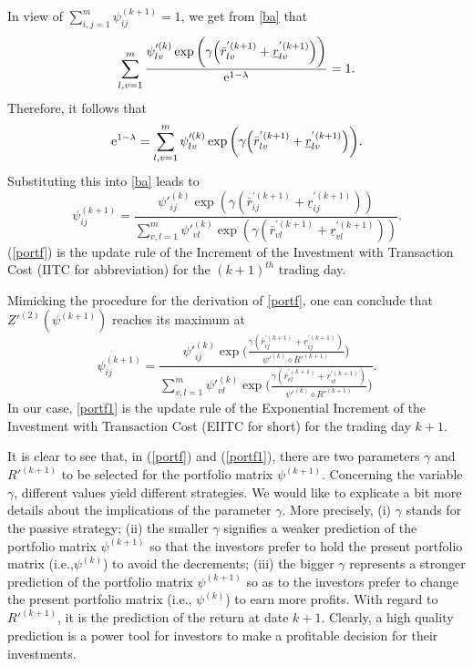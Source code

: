 \documentclass[11pt]{article}
\numberwithin{equation}{section}
\begin{document}
In view of  $\sum_{i,j=1}^m\psi^{(k+1)}_{ij}=1$, we get from \eqref{ba} that 
\begin{equation*} 
\sum_{l,v=1}^m\frac{\psi'^{(k)}_{lv}\exp\bigg(\gamma\Big(\bar r_{lv}^{'(k+1)}+\underline r_{lv}^{'(k+1)}\Big)\bigg)}{\text{\rm{e}}^{1-\lambda}}=1.
\end{equation*}
Therefore, it follows that
\begin{equation*} 
\text{\rm{e}}^{1-\lambda}=\sum_{l,v=1}^m\psi'^{(k)}_{lv}\exp\bigg(\gamma\Big(\bar r_{lv}^{'(k+1)}+\underline r_{lv}^{'(k+1)}\Big)\bigg).
\end{equation*}
Substituting this into \eqref{ba} leads to 
\begin{equation}\label{portf}
\psi^{(k+1)}_{ij}=\frac{\psi'^{(k)}_{ij}\exp(\gamma (\bar r_{ij}^{'(k+1)}+\underline r_{ij}^{'(k+1)}))}{\sum_{v,l=1}^{m}\psi'^{(k)}_{vl}\exp(\gamma (\bar r_{vl}^{'(k+1)}+\underline r_{vl}^{'(k+1)}))}.
\end{equation}
(\ref{portf}) is the update rule of the Increment of the Investment with Transaction Cost (IITC for abbreviation) for the $(k+1)^{th}$ trading day.

Mimicking the procedure for  the derivation of \eqref{portf},  one can conclude that $Z'^{(2)}(\psi^{(k+1)})$ reaches its maximum at 
\begin{equation}\label{portf1}
\psi^{(k+1)}_{ij}=\frac{\psi'^{(k)}_{ij}\exp\Big(\frac{\gamma (\bar r_{ij}^{'(k+1)}+\underline r_{ij}^{'(k+1)})}{\psi'^{(k)} \diamond R'^{(k+1)}}\Big)}{\sum_{v,l=1}^{m}\psi'^{(k)}_{vl}
\exp\Big(\frac{\gamma (\bar r_{vl}^{'(k+1)}+\underline r_{vl}^{'(k+1)})}{\psi'^{(k)} \diamond R'^{(k+1)}}\Big)}.
\end{equation}
In our case,  \eqref{portf1}  is the update rule of the Exponential  Increment of the Investment with Transaction Cost (EIITC for short) for the  trading day $k+1$.

It is clear to see  that, in (\ref{portf}) and (\ref{portf1}), there are two parameters  $\gamma$ and $R'^{(k+1)}$ to be selected for the portfolio matrix $\psi^{(k+1)}$. Concerning the variable  
$\gamma$, different values yield different strategies. We would like to explicate a bit more details about the implications of the parameter $\gamma$. More precisely, (i)  $\gamma$ stands 
for the passive strategy; (ii) the smaller $\gamma$ signifies a weaker prediction of the portfolio matrix $\psi^{(k+1)}$ so that the investors prefer to hold the present portfolio matrix (i.e.,$\psi^{(k)}$) 
to avoid the decrements; (iii) the bigger $\gamma$ represents a stronger prediction of  the portfolio matrix $\psi^{(k+1)}$  so as to the investors prefer  to change the present portfolio  matrix (i.e., 
$\psi^{(k)}$) to earn more profits. With regard to $R'^{(k+1)}$, it is the prediction of the return at date $k+1$. Clearly, a high quality prediction is a power tool for investors to make a profitable 
decision  for their investments.
\end{document}
